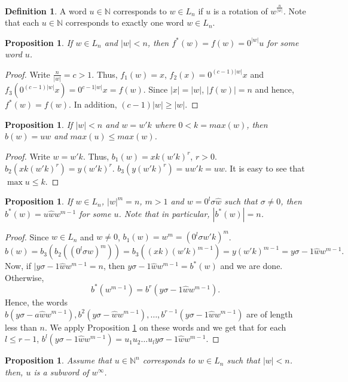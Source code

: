 \documentclass{article}
\newtheorem{proposition}[theorem]{Proposition}
\theoremstyle{definition}
\newtheorem{definition}{Definition}
\begin{document}
\begin{definition}
A word $u\in \mathbb{N}$ corresponds to $w\in L_n$ if $u$ is a rotation of $w^{\frac{n}{|w|}}$. Note that each $u\in \mathbb{N}$ corresponds to exactly one word $w\in L_n$.
\end{definition}

\begin{proposition}
\label{newforward}
If $w\in L_n$ and $|w|<n$, then $f^*(w)=f(w)=0^{|w|}u$ for some word $u$.
\end{proposition}
\begin{proof}
Write $\frac{n}{|w|}=c>1$. Thus, $f_1(w)=x$, $f_2(x)=0^{(c-1)|w|}x$ and $f_3(0^{(c-1)|w|}x)=0^{c-1|w|}x=f(w)$. Since $|x|=|w|$, $|f(w)|=n$ and hence, $f^*(w)=f(w)$. In addition, $(c-1)|w|\geq|w|$. 
\end{proof}

\begin{proposition}
\label{1-back}
If $|w|<n$ and $w=w'k$ where $0<k=max(w)$, then $b(w)=uw$ and $max(u)\leq max(w)$. 
\end{proposition}
\begin{proof}
Write $w=w'k$. Thus, $b_1(w)=xk(w'k)^r$, $r>0$. $b_2(xk(w'k)^r)=y(w'k)^r$. $b_3(y(w'k)^r)=uw'k=uw$. It is easy to see that $\max{u}\leq k$.
\end{proof}

\begin{proposition}
\label{*-back}
If $w\in L_n$, $|w|^m=n$, $m>1$ and $w= 0^l\sigma\hat{w}$ such that $\sigma\neq 0$, then $b^*(w)=u\hat{w}w^{m-1}$ for some $u$. Note that in particular, $|b^*(w)|=n$.
\end{proposition}

\begin{proof}
Since $w\in L_n$ and $w\neq 0$, $b_1(w)=w^m=(0^l\sigma w'k)^m$. 
$$b(w)=b_3(b_2((0^l\sigma\hat{w})^m))=b_3((xk)(w'k)^{m-1})=y(w'k)^{m-1}=y\sigma-1\hat{w}w^{m-1}.$$
Now, if $|y\sigma-1\hat{w}w^{m-1}=n$, then $y\sigma-1\hat{w}w^{m-1}=b^*(w)$ and we are done. Otherwise, 
$$b^*(w^{m-1})=b^r(y\sigma-1\hat{w}w^{m-1}).$$
Hence, the words $b(y\sigma-a\hat{w}w^{m-1}),b^2(y\sigma-\hat{w}w^{m-1}),\dots,b^{r-1}(y\sigma-1\hat{w}w^{m-1})$ are of length less than $n$. We apply Proposition \ref{1-back} on these words and we get that for each $l\leq r-1$,  $b^l(y\sigma-1\hat{w}w^{m-1})=u_1u_2\dots u_ly\sigma-1\hat{w}w^{m-1}$.
\end{proof}


\begin{proposition}
Assume that $u\in \mathbb{N}^n$ corresponds to $w\in L_n$ such that $|w|<n$. then, $u$ is a subword of $w^\infty$. 
\end{proposition}
\end{document}
